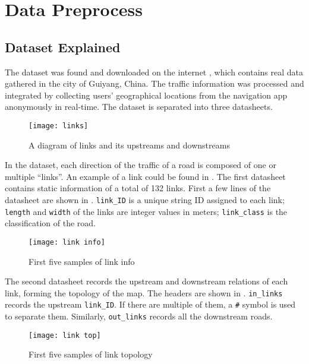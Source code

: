 \chapter{Data Preprocess} \label{Chapter:Preparation}

\section{Dataset Explained}

The dataset was found and downloaded on the internet \cite{Dataset}, which contains real data gathered in the city of Guiyang, China.
The traffic information was processed and integrated by collecting users' geographical locations from the navigation app anonymously in real-time. 
The dataset is separated into three datasheets. 

\begin{figure}[!htb]
    \centering
    \texttt{[image: links]}
    \caption{A diagram of links and its upstreams and downstreams}
    \label{Figure:links}
\end{figure}

In the dataset, each direction of the traffic of a road is composed of one or multiple “links”. An example of a link could be found in .
The first datasheet contains static information of a total of 132 links. First a few lines of the datasheet are shown in .
\verb|link_ID| is a unique string ID assigned to each link; \verb|length| and \verb|width| of the links are integer values in meters;
\verb|link_class| is the classification of the road.

\begin{figure}[!htb]
    \centering
    \texttt{[image: link info]}
    \caption{First five samples of link info}
    \label{Figure:link_info}
\end{figure}

The second datasheet records the upstream and downstream relations of each link, forming the topology of the map. The headers are shown in .
\verb|in_links| records the upstream \verb|link_ID|. If there are multiple of them, a \verb|#| symbol is used to separate them. 
Similarly, \verb|out_links| records all the downstream roads. 

\begin{figure}[!htb]
    \centering
    \texttt{[image: link top]}
    \caption{First five samples of link topology}
    \label{Figure:link_top}
\end{figure}

